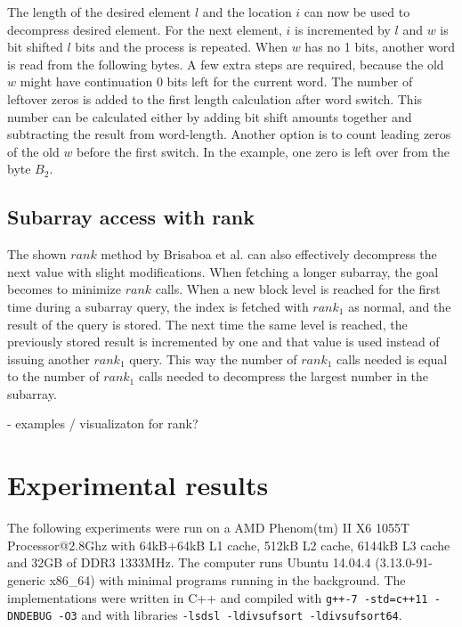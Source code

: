 The length of the desired element $l$ and the location $i$ can now be used to decompress desired element. For the next element, $i$ is incremented by $l$ and $w$ is bit shifted $l$ bits and the process is 
repeated. When $w$ has no 1 bits, another word is read from the following bytes. A few extra steps are required, because the old $w$ might have continuation 0 bits left for the current word. The number of leftover 
zeros is added to the first length calculation after word switch. This number can be calculated either by adding bit shift amounts together and subtracting the result from word-length. Another option is to count 
leading zeros of the old $w$ before the first switch. In the example, one zero is left over from the byte $B_2$.

\section{Subarray access with rank}
The shown $rank$ method by Brisaboa et al. can also effectively decompress the next value with slight modifications. When fetching a longer subarray, the goal becomes to minimize $rank$ calls. 
When a new block level is reached for the first time during a subarray query, the index is fetched with $rank_1$ as normal, and the result of the query is stored. The next time the same level is reached, the
previously stored result is incremented by one and that value is used instead of issuing another $rank_1$ query. This way the number of $rank_1$ calls needed is equal to the number of $rank_1$ calls 
needed to decompress the largest number in the subarray.

 - examples / visualizaton for rank?


\chapter{Experimental results}

The following experiments were run on a AMD Phenom(tm) II X6 1055T Processor@2.8Ghz with 64kB+64kB L1 cache, 512kB L2 cache, 6144kB L3 cache and 32GB of DDR3 1333MHz.
The computer runs Ubuntu 14.04.4 (3.13.0-91-generic x86\_64) with minimal programs running in the background. The implementations were written in C++ and compiled with 
\texttt{g++-7 -std=c++11 -DNDEBUG -O3} 
and with libraries \texttt{-lsdsl -ldivsufsort -ldivsufsort64}.


